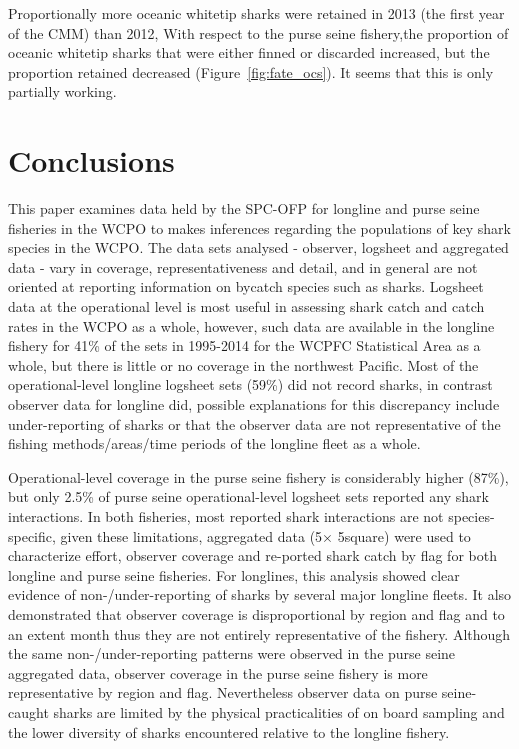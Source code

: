 \documentclass[12pt]{SCreport}
\begin{document}
Proportionally  more oceanic whitetip sharks were retained in 2013 (the first year of the CMM) than 2012,   With respect to the purse seine fishery,the proportion of oceanic whitetip sharks that were either finned or discarded increased, but the proportion retained decreased (Figure~\ref{fig:fate_ocs}).  It seems that this is only partially working.

 

\section{Conclusions }

This paper examines data held by the SPC-OFP for longline and purse seine fisheries in the WCPO to makes inferences regarding the populations of key shark species in the WCPO. The data sets analysed - observer, logsheet and aggregated data - vary in coverage, representativeness and detail, and in general are not oriented at reporting information on bycatch species such as sharks. Logsheet data at the operational level is most useful in assessing shark catch and catch rates in the WCPO as a whole, however, such data are available in the longline fishery for 41\% of the sets in 1995-2014 for the WCPFC Statistical Area as a whole, but there is little or no coverage in the northwest Pacific. Most of the operational-level longline logsheet sets (59\%) did not record sharks, in contrast  observer data for longline did, possible explanations for this discrepancy include under-reporting of sharks or that the observer data are not representative of the fishing methods/areas/time periods of the longline fleet as a whole.

Operational-level coverage in the purse seine fishery is considerably higher (87\%), but only 2.5\% of purse seine operational-level logsheet sets reported any shark interactions. In both fisheries, most reported shark interactions are not species-specific, given these limitations, aggregated data (5\degree $\times$ 5\degree square) were used to characterize effort, observer coverage and re-ported shark catch by flag for both longline and purse seine fisheries. For longlines, this analysis showed clear evidence of non-/under-reporting of sharks by several major longline fleets. It also demonstrated that observer coverage is disproportional by region and flag and to an extent month thus they are not entirely representative of the fishery. Although the same non-/under-reporting patterns were observed in the purse seine aggregated data, observer coverage in the purse seine fishery is more representative by region and flag. Nevertheless observer data on purse seine-caught sharks are limited by the physical practicalities of on board sampling and the lower diversity of sharks encountered relative to the longline fishery.
\end{document}
